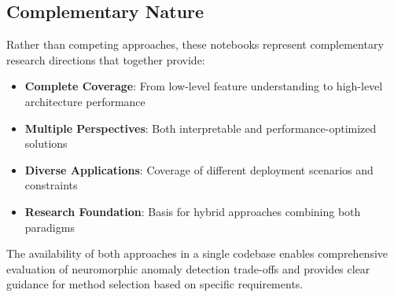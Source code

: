 \documentclass[11pt,a4paper]{article}
\begin{document}
\subsection{Complementary Nature}

Rather than competing approaches, these notebooks represent complementary research directions that together provide:

\begin{itemize}
    \item \textbf{Complete Coverage}: From low-level feature understanding to high-level architecture performance
    \item \textbf{Multiple Perspectives}: Both interpretable and performance-optimized solutions
    \item \textbf{Diverse Applications}: Coverage of different deployment scenarios and constraints
    \item \textbf{Research Foundation}: Basis for hybrid approaches combining both paradigms
\end{itemize}

The availability of both approaches in a single codebase enables comprehensive evaluation of neuromorphic anomaly detection trade-offs and provides clear guidance for method selection based on specific requirements.
\end{document}
